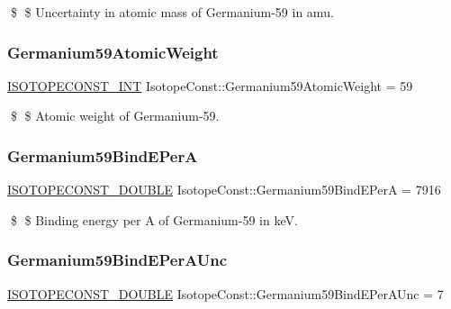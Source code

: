 \$ \$ Uncertainty in atomic mass of Germanium-\/59 in amu. \mbox{\label{group___isotope_const-_germanium-_ge59_ga223bc645a6ca461b8161aa74be910e77}} 
\subsubsection{\texorpdfstring{Germanium59\+Atomic\+Weight}{Germanium59AtomicWeight}}
{\footnotesize\ttfamily \mbox{\hyperlink{group___isotope_const-_macros_ga5f18360b3e99483a35c32d789e62621c}{I\+S\+O\+T\+O\+P\+E\+C\+O\+N\+S\+T\+\_\+\+I\+NT}} Isotope\+Const\+::\+Germanium59\+Atomic\+Weight = 59}

\$ \$ Atomic weight of Germanium-\/59. \mbox{\label{group___isotope_const-_germanium-_ge59_ga6a416b4ef25a7304227adbf2c85b2ee2}} 
\subsubsection{\texorpdfstring{Germanium59\+Bind\+E\+PerA}{Germanium59BindEPerA}}
{\footnotesize\ttfamily \mbox{\hyperlink{group___isotope_const-_macros_ga8f45a7272ce02c0b4c65c44636ed719a}{I\+S\+O\+T\+O\+P\+E\+C\+O\+N\+S\+T\+\_\+\+D\+O\+U\+B\+LE}} Isotope\+Const\+::\+Germanium59\+Bind\+E\+PerA = 7916}

\$ \$ Binding energy per A of Germanium-\/59 in keV. \mbox{\label{group___isotope_const-_germanium-_ge59_gaf15f6af0edf608113c847d14a10f794a}} 
\subsubsection{\texorpdfstring{Germanium59\+Bind\+E\+Per\+A\+Unc}{Germanium59BindEPerAUnc}}
{\footnotesize\ttfamily \mbox{\hyperlink{group___isotope_const-_macros_ga8f45a7272ce02c0b4c65c44636ed719a}{I\+S\+O\+T\+O\+P\+E\+C\+O\+N\+S\+T\+\_\+\+D\+O\+U\+B\+LE}} Isotope\+Const\+::\+Germanium59\+Bind\+E\+Per\+A\+Unc = 7}


